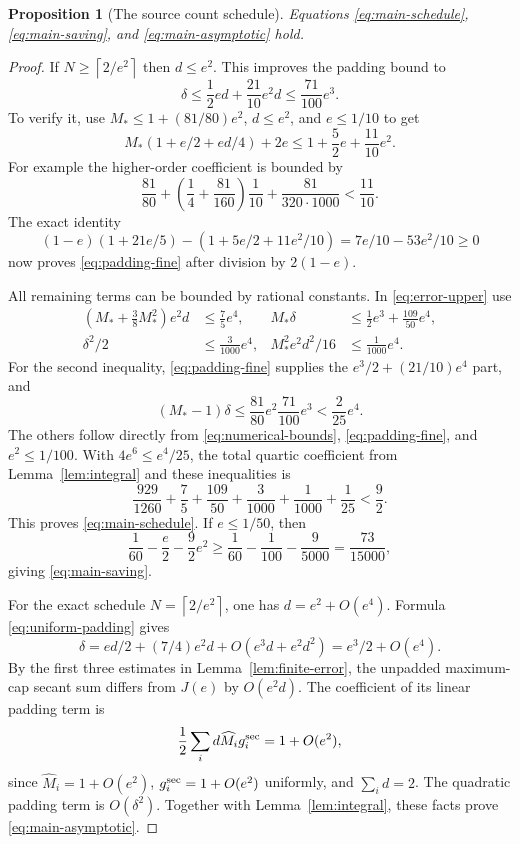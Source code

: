 \documentclass[11pt]{amsart}
\newtheorem{proposition}[theorem]{Proposition}
\theoremstyle{definition}
\theoremstyle{remark}
\newcommand{\ceil}[1]{\left\lceil#1\right\rceil}
\begin{document}
\begin{proposition}[The source count schedule]\label{prop:schedule}
Equations \eqref{eq:main-schedule}, \eqref{eq:main-saving}, and
\eqref{eq:main-asymptotic} hold.
\end{proposition}
\begin{proof}
If $N\ge\ceil{2/e^2}$ then $d\le e^2$. This improves the padding
bound to
\begin{equation}\label{eq:padding-fine}
 \delta\le\frac12ed+\frac{21}{10}e^2d
          \le\frac{71}{100}e^3.
\end{equation}
To verify it, use $M_*\le1+(81/80)e^2$, $d\le e^2$, and
$e\le1/10$ to get
\[
 M_*(1+e/2+ed/4)+2e\le1+\frac52e+\frac{11}{10}e^2.
\]
For example the higher-order coefficient is bounded by
\[
 \frac{81}{80}+
 \left(\frac14+\frac{81}{160}\right)\frac1{10}
 +\frac{81}{320\cdot1000}<\frac{11}{10}.
\]
The exact identity
\[
 (1-e)(1+21e/5)-(1+5e/2+11e^2/10)
 =7e/10-53e^2/10\ge0
\]
now proves \eqref{eq:padding-fine} after division by $2(1-e)$.

All remaining terms can be bounded by rational constants. In
\eqref{eq:error-upper} use
\begin{align*}
 \left(M_*+\frac38M_*^2\right)e^2d&\le\frac75e^4,&
 M_*\delta&\le\frac12e^3+\frac{109}{50}e^4,\\
 \delta^2/2&\le\frac3{1000}e^4,&
 M_*^2e^2d^2/16&\le\frac1{1000}e^4.
\end{align*}
For the second inequality, \eqref{eq:padding-fine} supplies the
$e^3/2+(21/10)e^4$ part, and
\[
 (M_*-1)\delta
 \le\frac{81}{80}e^2\frac{71}{100}e^3
 <\frac2{25}e^4.
\]
The others follow directly from \eqref{eq:numerical-bounds},
\eqref{eq:padding-fine}, and $e^2\le1/100$. With
$4e^6\le e^4/25$, the total quartic coefficient from
Lemma~\ref{lem:integral} and these inequalities is
\[
 \frac{929}{1260}+\frac75+\frac{109}{50}
 +\frac3{1000}+\frac1{1000}+\frac1{25}<\frac92.
\]
This proves \eqref{eq:main-schedule}. If $e\le1/50$, then
\[
 \frac1{60}-\frac e2-\frac92e^2
 \ge\frac1{60}-\frac1{100}-\frac9{5000}
 =\frac{73}{15000},
\]
giving \eqref{eq:main-saving}.

For the exact schedule $N=\ceil{2/e^2}$, one has
$d=e^2+O(e^4)$. Formula \eqref{eq:uniform-padding} gives
\[
 \delta=ed/2+(7/4)e^2d+O(e^3d+e^2d^2)
       =e^3/2+O(e^4).
\]
By the first three estimates in Lemma~\ref{lem:finite-error}, the
unpadded maximum-cap secant sum differs from $J(e)$ by $O(e^2d)$.
The coefficient of its linear padding term is
\[
 \frac12\sum_i d\widehat M_i g_i^{\rm sec}=1+O(e^2),
\]
since $\widehat M_i=1+O(e^2)$, $g_i^{\rm sec}=1+O(e^2)$
uniformly, and $\sum_i d=2$. The quadratic padding term is
$O(\delta^2)$. Together with Lemma~\ref{lem:integral}, these facts
prove \eqref{eq:main-asymptotic}.
\end{proof}
\end{document}
